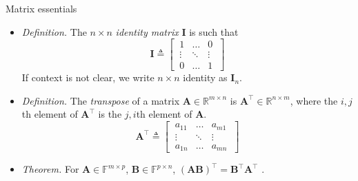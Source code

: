 \documentclass{beamer}
\numberwithin{equation}{section}
\begin{document}
\begin{frame}{Matrix essentials}
    \begin{itemize}
        \item
        \textit{Definition.} The $ n \times n $ \textit{identity matrix}
        $ \mathbf{I} $ is such that
        \begin{equation*}
            \mathbf{I} \triangleq \begin{bmatrix}
                \ 1 & \ldots & 0 \ \\
                \ \vdots & \ddots & \vdots \ \\
                \ 0 & \ldots & 1 \
            \end{bmatrix}
        \end{equation*}
        If context is not clear, we write $ n \times n $ identity as
        $ \mathbf{I}_n $.

	    \item
        \textit{Definition.} The \textit{transpose} of a matrix
        $ \mathbf{A} \in \mathbb{R}^{m \times n } $ is $ \mathbf{A}^\top
        \in \mathbb{R}^{n \times m} $, where the $ i, j $th element of
        $ \mathbf{A}^\top $ is the $ j, i $th element of $ \mathbf{A} $.
        \begin{equation*}
            \mathbf{A}^\top \triangleq \begin{bmatrix}
                \ a_{11} & \ldots & a_{m1} \ \\
                \ \vdots & \ddots & \vdots \ \\
                \ a_{1n} & \ldots & a_{mn} \
            \end{bmatrix}        
        \end{equation*}

        \item
        \textit{Theorem.} For $ \mathbf{A} \in \mathbb{F}^{m \times p} $,
        $ \mathbf{B} \in \mathbb{F}^{p \times n} $,
        $ (\mathbf{AB})^\top = \mathbf{B}^\top\mathbf{A}^\top $
        \cite{jacob_linalg}.
    \end{itemize}
\end{frame}
\end{document}
